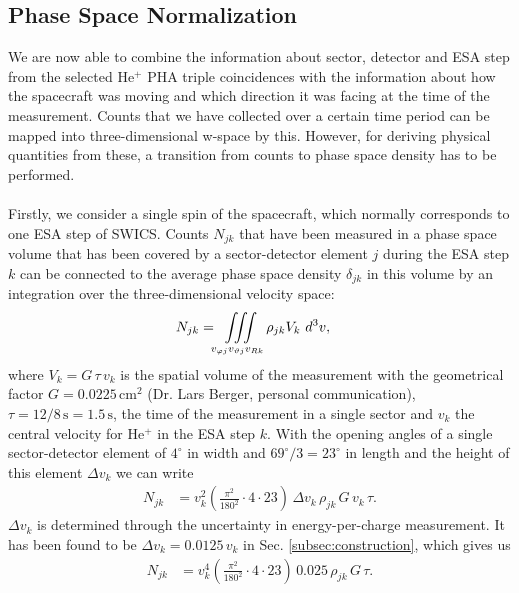 \subsection{Phase Space Normalization}
We are now able to combine the information about sector, detector and ESA step from the selected $\mathrm{He^{+}}$ PHA triple coincidences with the information about how the spacecraft was moving and which direction it was facing at the time of the measurement.
Counts that we have collected over a certain time period can be mapped into three-dimensional w-space by this. However, for deriving physical quantities from these, a transition from counts to phase space density has to be performed.\\ \\
Firstly, we consider a single spin of the spacecraft, which normally corresponds to one ESA step of SWICS.
Counts $N_{jk}$ that have been measured in a phase space volume that has been covered by a sector-detector element $j$ during the ESA step $k$ can be connected to the average phase space density $\delta_{jk}$ in this volume by an integration over the three-dimensional velocity space:
\begin{align*}
N_{jk} &= \iiint\displaylimits_{v_{\varphi j}v_{\vartheta j}v_{R k}} \rho_{jk}	V_k	\,\,	d^3v,
\end{align*}
where $V_k = G \, \tau \, v_k$ is the spatial volume of the measurement with the geometrical factor $G = 0.0225 \,\mathrm{cm^2}$ (Dr. Lars Berger, personal communication), $\tau = 12/8\,\mathrm{s} = 1.5\,\mathrm{s}$, the time of the measurement in a single sector and $v_k$ the central velocity for $\mathrm{He^{+}}$ in the ESA step $k$.
With the opening angles of a single sector-detector element of $4^\circ$ in width and $69^\circ /3 = 23^\circ$ in length and the height of this element $\Delta v_k$ we can write
\begin{align*}
N_{jk} &= v^2_k \left(\frac{\pi^2}{180^2}\cdot4 \cdot 23\right) \, \Delta v_k \, \rho_{jk} \,	G \, v_k \, \tau.
\end{align*}
$\Delta v_k$ is determined through the uncertainty in energy-per-charge measurement. It has been found to be $\Delta v_k = 0.0125 \, v_k$ in Sec. \ref{subsec:construction}, which gives us
\begin{align*}
N_{jk} &= v^4_k \left(\frac{\pi^2}{180^2}\cdot4 \cdot 23\right) \, 0.025\, \rho_{jk} \, G  \, \tau.
\end{align*}
